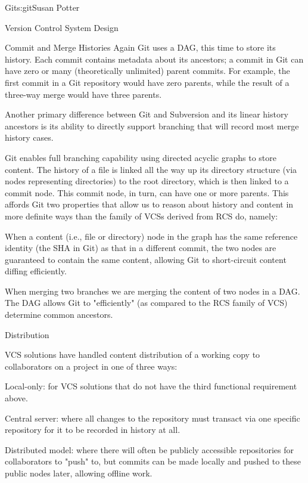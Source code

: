 \begin{aosachapter}{Git}{s:git}{Susan Potter}
\begin{aosasect1}{Version Control System Design}
\begin{aosasect2}{Commit and Merge Histories}
Again Git uses a DAG, this time to store its history. Each commit contains
metadata about its ancestors; a commit in Git can have zero or many
(theoretically unlimited) parent commits. For example, the first commit
in a Git repository would have zero parents, while the result of a three-way merge
would have three parents.

Another primary difference between Git and Subversion and its linear history
ancestors is its ability to directly support branching that will record
most merge history cases.


Git enables full branching capability using directed acyclic
graphs to store content. The history of a file is linked all the way
up its directory structure (via nodes representing directories) to the root
directory, which is then linked to a commit node. This commit node, in turn,
can have one or more parents. This affords Git two
properties that allow us to reason about history and content in
more definite ways than the family of VCSs derived from RCS do, namely:
\begin{aosaitemize}
  \item When a content (i.e., file or directory) node in the graph has the same
  reference identity (the SHA in Git) as that in a different commit, the two
  nodes are guaranteed to contain the same content, allowing Git to
  short-circuit content diffing efficiently.
  \item When merging two branches we are merging the content of two nodes
  in a DAG. The DAG allows Git to "efficiently" (as compared to the
  RCS family of VCS) determine common ancestors.
\end{aosaitemize}

\end{aosasect2}
\begin{aosasect2}{Distribution}

VCS solutions have handled content distribution of a working copy to collaborators on a
project in one of three ways:
\begin{aosaitemize}
  \item Local-only: for VCS solutions that do not have the
    third functional requirement above.
  \item Central server: where all changes to the repository must transact
    via one specific repository for it to be recorded in history at all.
  \item Distributed model: where there will often be publicly accessible
    repositories for collaborators to "push" to, but commits can be made
    locally and pushed to these public nodes later, allowing offline work.
\end{aosaitemize}


\end{aosasect2}
\end{aosasect1}
\end{aosachapter}
